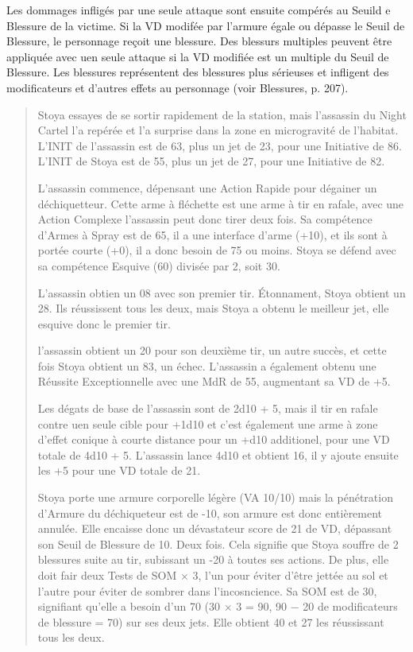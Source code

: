 Les dommages infligés par une seule attaque sont ensuite compérés au Seuild e Blessure de la victime. Si la VD modifée par l'armure égale ou dépasse le Seuil de Blessure, le personnage reçoit une blessure. Des blessurs multiples peuvent être appliquée avec uen seule attaque si la VD modifiée est un multiple du Seuil de Blessure. Les blessures représentent des blessures plus sérieuses et infligent des modificateurs et d'autres effets au personnage (voir Blessures, p. 207). 

\begin{quotation} Stoya essayes de se sortir rapidement de la station, mais l'assassin du  Night Cartel l'a repérée et l'a surprise dans la zone en microgravité de l'habitat. L'INIT de l'assassin est de 63, plus un jet de 23, pour une Initiative de 86. L'INIT de Stoya est de 55, plus un jet de 27, pour une Initiative de 82. 

L'assassin commence, dépensant une Action Rapide pour dégainer un déchiquetteur. Cette arme à fléchette est une arme à tir en rafale, avec une Action Complexe l'assassin peut donc tirer deux fois. Sa compétence d'Armes à Spray est de 65, il a une interface d'arme (+10), et ils sont à portée courte (+0), il a donc besoin de 75 ou moins. Stoya se défend avec sa compétence Esquive (60) divisée par 2, soit 30. 

L'assassin obtien un 08 avec son premier tir. Étonnament, Stoya obtient un 28. Ils réussissent tous les deux, mais Stoya a obtenu le meilleur jet, elle esquive donc le premier tir. 

l'assassin obtient un 20 pour son deuxième tir, un autre succès, et cette fois Stoya obtient un 83, un échec. L'assassin a également obtenu une Réussite Exceptionnelle avec une MdR de 55, augmentant sa VD de +5. 

Les dégats de base de l'assassin sont de 2d10 + 5, mais il tir en rafale contre uen seule cible pour +1d10 et c'est également une arme à zone d'effet conique à courte distance pour un +d10 additionel, pour une VD totale de 4d10 + 5. L'assassin lance 4d10 et obtient 16, il y ajoute ensuite les +5 pour une VD totale de 21. 

Stoya porte une armure corporelle légère (VA 10/10) mais la pénétration d'Armure du déchiqueteur est de -10, son armure est donc entièrement annulée. Elle encaisse donc un dévastateur score de 21 de VD, dépassant son Seuil de Blessure de 10. Deux fois. Cela signifie que Stoya souffre de 2 blessures suite au tir, subissant un -20 à toutes ses actions. De plus, elle doit fair deux Tests de SOM $\times$ 3, l'un pour éviter d'être jettée au sol et l'autre pour éviter de sombrer dans l'incosncience. Sa SOM est de 30, signifiant qu'elle a besoin d'un 70 (30 $\times$ 3 = 90, 90 $-$ 20 de modificateurs de blessure = 70) sur ses deux jets. Elle obtient 40 et 27 les réussissant tous les deux. 


\end{quotation}
